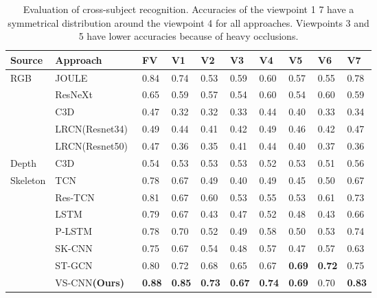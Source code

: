 \documentclass[journal]{IEEEtran}
\begin{document}
\begin{table*}[!t] \footnotesize
\begin{center}
\caption{Evaluation of cross-subject recognition. Accuracies of the viewpoint 1  7 have a symmetrical distribution around the viewpoint 4 for all approaches. Viewpoints 3 and 5 have lower accuracies because of heavy occlusions.}
\label{tab:crossSub}
\begin{tabular}{|p{1 cm}|p{2.3cm}|p{1cm}|p{1cm}|p{1cm}|p{1cm}|p{1cm}|p{1cm}|p{1cm}|p{1cm}|}
\hline
Source & Approach & FV & V1 & V2 & V3  & V4 & V5 & V6 & V7  \\
\hline
\multirow{4}{*}{RGB} & JOULE~\cite{JOULE2016} & 0.84  & 0.74 & 0.53 & 0.59 & 0.60 & 0.57 & 0.55 & 0.78  \\
 & ResNeXt~\cite{ResNeXtARX2018} & 0.65  & 0.59 & 0.57 & 0.54 & 0.60 & 0.54 & 0.60 & 0.59 \\
 & C3D~\cite{C3DICCV2015} & 0.47  & 0.32  & 0.32  & 0.33  & 0.44  & 0.40  & 0.33  & 0.34   \\
 & LRCN(Resnet34)~\cite{LRCNCVPR2015} & 0.49  & 0.44  & 0.41  & 0.42  & 0.49  & 0.46  & 0.42  & 0.47  \\
 & LRCN(Resnet50)~\cite{LRCNCVPR2015} & 0.47  & 0.36  & 0.35  & 0.41  & 0.44  & 0.40  & 0.37  & 0.36  \\
 \hline
\multirow{1}{*}{Depth} & C3D~\cite{C3DICCV2015} & 0.54  &  0.53 & 0.53  & 0.53  & 0.52  & 0.53 & 0.51  & 0.56 \\
\hline
\multirow{7}{*}{Skeleton} & TCN~\cite{TCN2017} & 0.78 & 0.67 & 0.49 & 0.40 & 0.49 & 0.45 & 0.50 & 0.67 \\
 & Res-TCN~\cite{ResTCN2017} & 0.81 & 0.67 & 0.60 & 0.53 & 0.55 & 0.53 & 0.61 & 0.73  \\
 & LSTM~\cite{ShahroudyNTU2016} & 0.79 & 0.67 & 0.43 & 0.47 & 0.52 & 0.48 & 0.43 & 0.66  \\
 & P-LSTM~\cite{ShahroudyNTU2016} & 0.78 & 0.70 & 0.52 & 0.49 & 0.58 & 0.50 & 0.53 & 0.74 \\
 & SK-CNN~\cite{EnhancedSK2017} & 0.75 & 0.67 & 0.54 & 0.48 & 0.57 & 0.47 & 0.57 & 0.63 \\
 & ST-GCN~\cite{STGCN2018} & 0.80 & 0.72 & 0.68 & 0.65 & 0.67 & \textbf{0.69} & \textbf{0.72} & 0.75 \\
 & VS-CNN\textbf{(Ours)} & \textbf{0.88}  & \textbf{0.85} &  \textbf{0.73} & \textbf{0.67} & \textbf{0.74} & \textbf{0.69} & 0.70 & \textbf{0.83} \\
\hline
\end{tabular}
\end{center}
\end{table*}
\end{document}
